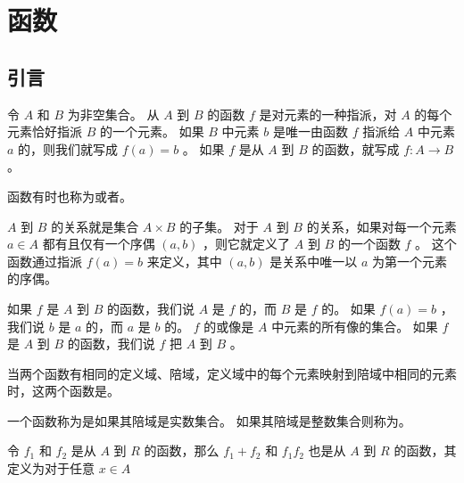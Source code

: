 
\section{函数}
{
    \subsection{引言}
    {
        \begin{defines}
            令 $A$ 和 $B$ 为非空集合。
            从 $A$ 到 $B$ 的函数 $f$ 是对元素的一种指派，对 $A$ 的每个元素恰好指派 $B$ 的一个元素。
            如果 $B$ 中元素 $b$ 是唯一由函数 $f$ 指派给 $A$ 中元素 $a$ 的，则我们就写成 $f(a) = b$ 。
            如果 $f$ 是从 $A$ 到 $B$ 的函数，就写成 $f: A \rightarrow B$ 。
        \end{defines}

        \begin{defines}
            函数有时也称为或者。
        \end{defines}

        $A$ 到 $B$ 的关系就是集合 $A \times B$ 的子集。
        对于 $A$ 到 $B$ 的关系，如果对每一个元素 $a \in A$ 都有且仅有一个序偶 $(a, b)$ ，则它就定义了 $A$ 到 $B$ 的一个函数 $f$ 。
        这个函数通过指派 $f(a) = b$ 来定义，其中 $(a, b)$ 是关系中唯一以 $a$ 为第一个元素的序偶。

        \begin{defines}
            如果 $f$ 是 $A$ 到 $B$ 的函数，我们说 $A$ 是 $f$ 的，而 $B$ 是 $f$ 的。
            如果 $f(a) = b$ ，我们说 $b$ 是 $a$ 的，而 $a$ 是 $b$ 的。
            $f$ 的或像是 $A$ 中元素的所有像的集合。
            如果 $f$ 是 $A$ 到 $B$ 的函数，我们说 $f$ 把 $A$ 到 $B$ 。
        \end{defines}

        当两个函数有相同的定义域、陪域，定义域中的每个元素映射到陪域中相同的元素时，这两个函数是。

        一个函数称为是如果其陪域是实数集合。
        如果其陪域是整数集合则称为。

        \begin{defines}
            令 $f_1$ 和 $f_2$ 是从 $A$ 到 $R$ 的函数，那么 $f_1 + f_2$ 和 $f_1f_2$ 也是从 $A$ 到 $R$ 的函数，其定义为对于任意 $x \in A$


\end{defines}}}
